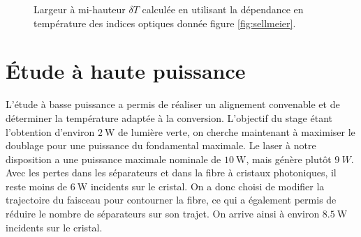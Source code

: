 \documentclass[11pt,a4paper]{article}
\newcommand{\zr}{z_\mathsc{R}}
\newcommand{\mathsc}[1]{\mathrm{\scriptscriptstyle {#1}}}
\begin{document}

\begin{figure}[htpb] 
\centering
	\small
	
	\vspace{-0.42cm}
	\caption{Largeur à mi-hauteur $\delta T$ calculée en utilisant la dépendance en température des indices optiques donnée figure \ref{fig:sellmeier}.}
	\label{fig:fwhm}
\end{figure}


\section{Étude à haute puissance}

L'étude à basse puissance a permis de réaliser un alignement convenable et de déterminer la température adaptée à la conversion. L'objectif du stage étant l'obtention d'environ $\SI{2}{\watt}$ de lumière verte, on cherche maintenant à maximiser le doublage pour une puissance du fondamental maximale. Le laser à notre disposition a une puissance maximale nominale de $\SI{10}{\watt}$, mais génère plutôt $\SI{9}{W}$. Avec les pertes dans les séparateurs et dans la fibre à cristaux photoniques, il reste moins de $\SI{6}{\watt}$ incidents sur le cristal. On a donc choisi de modifier la trajectoire du faisceau pour contourner la fibre, ce qui a également permis de réduire le nombre de séparateurs sur son trajet. On arrive ainsi à environ $\SI{8.5}{\watt}$ incidents sur le cristal. 
\end{document}
